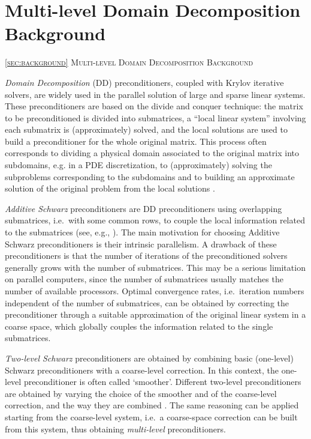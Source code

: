 \section{Multi-level Domain Decomposition Background\label{sec:background}}
         {\textsc{\ref{sec:background} Multi-level Domain Decomposition Background}}

\emph{Domain Decomposition} (DD) preconditioners, coupled with Krylov iterative
solvers, are widely used in the parallel solution of large and sparse linear systems.
These preconditioners are based on the divide and conquer technique: the matrix
to be preconditioned is divided into submatrices, a ``local linear system''
involving each submatrix is (approximately) solved, and the local solutions are used
to build a preconditioner for the whole original matrix. This process
often corresponds to dividing a physical domain associated to the original matrix
into subdomains, e.g. in a PDE discretization, to (approximately) solving the
subproblems corresponding to the subdomains and to building an approximate
solution of the original problem from the local solutions 
\cite{Cai_Widlund_92,dd1_94,dd2_96}. 

\emph{Additive Schwarz} preconditioners are DD preconditioners using overlapping
submatrices, i.e.\ with some common rows, to couple the local information
related to the submatrices (see, e.g., \cite{dd2_96}).
The main motivation for choosing Additive Schwarz preconditioners is their
intrinsic parallelism. A drawback of these
preconditioners is that the number of iterations of the preconditioned solvers
generally grows with the number of submatrices. This may be a serious limitation
on parallel computers, since the number of submatrices usually matches the number
of available processors. Optimal convergence rates, i.e.\ iteration numbers
independent of the number of submatrices, can be obtained by correcting the
preconditioner through a suitable approximation of the original linear system
in a coarse space, which globally couples the information related to the single
submatrices. 

\emph{Two-level Schwarz} preconditioners are obtained
by combining basic (one-level) Schwarz preconditioners with a coarse-level
correction. In this context, the one-level preconditioner is often
called `smoother'. Different two-level preconditioners are obtained by varying the
choice of the smoother and of the coarse-level correction, and the
way they are combined \cite{dd2_96}. The same reasoning can be applied starting
from the coarse-level system, i.e.\ a coarse-space correction can be built
from this system, thus obtaining \emph{multi-level} preconditioners.

